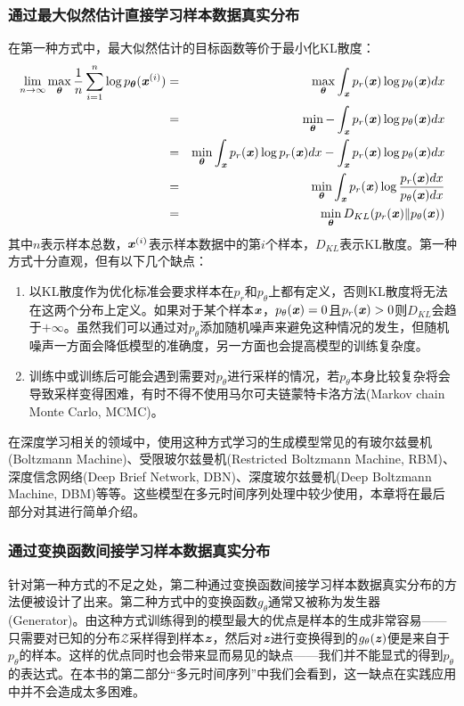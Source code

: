 \subsubsection{通过最大似然估计直接学习样本数据真实分布}
在第一种方式中，最大似然估计的目标函数等价于最小化KL散度：
\begin{eqnarray}
\lim_{n\to\infty} \max_{\bm{\theta}}\frac{1}{n}\sum_{i=1}^{n}\log p_{\bm{\theta}}(\Vx^{(i)})
&=& \max_{\bm{\theta}}\int_{\Vx}p_{r}(\Vx)\log p_{\theta}(\Vx)dx\\
&=& \min_{\bm{\theta}}-\int_{\Vx}p_{r}(\Vx)\log p_{\theta}(\Vx)dx\\
&=& \min_{\bm{\theta}}\int_{\Vx}p_{r}(\Vx)\log p_{r}(\Vx)dx - \int_{\Vx}p_{r}(\Vx)\log p_{\theta}(\Vx)dx\\
&=& \min_{\bm{\theta}}\int_{\Vx}p_{r}(\Vx)\log \frac{p_{r}(\Vx)dx}{p_{\theta}(\Vx)dx}\\
&=& \min_{\bm{\theta}} D_{KL}(p_{r}(\Vx)\|p_{\theta}(\Vx))
\end{eqnarray}
其中$n$表示样本总数，$\boldsymbol{\mathit{x}}^{(i)}$表示样本数据中的第$i$个样本，$D_{KL}$表示KL散度。第一种方式十分直观，但有以下几个缺点：
\begin{enumerate}
	\setlength{\itemsep}{0pt}
    \setlength{\parsep}{0pt}
    \setlength{\parskip}{0pt}
	\item 以KL散度作为优化标准会要求样本在$p_{r}$和$p_{\theta}$上都有定义，否则KL散度将无法在这两个分布上定义。如果对于某个样本$\boldsymbol{\mathit{x}}$，$p_{\theta}(\boldsymbol{\mathit{x}})=0$且$p_{r}(\boldsymbol{\mathit{x}})>0$则$D_{KL}$会趋于$+\infty$。虽然我们可以通过对$p_{\theta}$添加随机噪声来避免这种情况的发生，但随机噪声一方面会降低模型的准确度，另一方面也会提高模型的训练复杂度。
	\item 训练中或训练后可能会遇到需要对$p_{\theta}$进行采样的情况，若$p_{\theta}$本身比较复杂将会导致采样变得困难，有时不得不使用马尔可夫链蒙特卡洛方法(Markov chain Monte Carlo, MCMC)。
\end{enumerate}
在深度学习相关的领域中，使用这种方式学习的生成模型常见的有玻尔兹曼机(Boltzmann Machine)、受限玻尔兹曼机(Restricted Boltzmann Machine, RBM)、深度信念网络(Deep Brief Network, DBN)、深度玻尔兹曼机(Deep Boltzmann Machine, DBM)等等。这些模型在多元时间序列处理中较少使用，本章将在最后部分对其进行简单介绍。

\subsubsection{通过变换函数间接学习样本数据真实分布}
针对第一种方式的不足之处，第二种通过变换函数间接学习样本数据真实分布的方法便被设计了出来。第二种方式中的变换函数$g_{\theta}$通常又被称为发生器(Generator)。由这种方式训练得到的模型最大的优点是样本的生成非常容易——只需要对已知的分布$\mathcal{Z}$采样得到样本$\boldsymbol{\mathit{z}}$，然后对$\boldsymbol{\mathit{z}}$进行变换得到的$g_{\theta}(\boldsymbol{\mathit{z}})$便是来自于$p_{\theta}$的样本。这样的优点同时也会带来显而易见的缺点——我们并不能显式的得到$p_{\theta}$的表达式。在本书的第二部分“多元时间序列”中我们会看到，这一缺点在实践应用中并不会造成太多困难。

